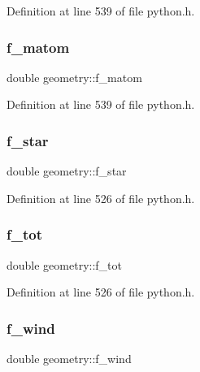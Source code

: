 Definition at line 539 of file python.\+h.

\mbox{\label{structgeometry_a9f2f7de2ab84764858a2bead77fd25f0}} 
\subsubsection{\texorpdfstring{f\+\_\+matom}{f\_matom}}
{\footnotesize\ttfamily double geometry\+::f\+\_\+matom}



Definition at line 539 of file python.\+h.

\mbox{\label{structgeometry_a33bc4357b9b25da6846e2580389ccae9}} 
\subsubsection{\texorpdfstring{f\+\_\+star}{f\_star}}
{\footnotesize\ttfamily double geometry\+::f\+\_\+star}



Definition at line 526 of file python.\+h.

\mbox{\label{structgeometry_ad5447868ade5623c1e82f43d3e023927}} 
\subsubsection{\texorpdfstring{f\+\_\+tot}{f\_tot}}
{\footnotesize\ttfamily double geometry\+::f\+\_\+tot}



Definition at line 526 of file python.\+h.

\mbox{\label{structgeometry_a6d7e46da2dc9c222ac08c60d416dcd63}} 
\subsubsection{\texorpdfstring{f\+\_\+wind}{f\_wind}}
{\footnotesize\ttfamily double geometry\+::f\+\_\+wind}



